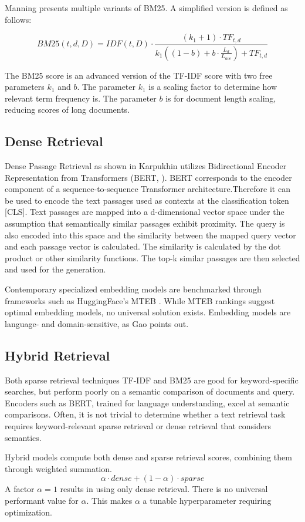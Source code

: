 Manning \cite{Manning.2009} presents multiple variants of BM25. A simplified version is defined as follows:

$$BM25(t, d, D) = IDF(t, D) \cdot \frac{(k_1 + 1) \cdot TF_{t, d}}{k_1((1-b)+b \cdot \frac{L_d}{L_{ave}}) + TF_{t, d}}$$


The BM25 score is an advanced version of the TF-IDF score with two free parameters $k_1$ and $b$. The parameter $k_1$ is a scaling factor to determine how relevant term frequency is. The parameter $b$ is for document length scaling, reducing scores of long documents. 

\subsection{Dense Retrieval}
\label{sec:dense_retrieval}

Dense Passage Retrieval as shown in Karpukhin \cite{karpukhin2020densepassageretrievalopendomain} utilizes Bidirectional Encoder Representation from Transformers (BERT, \cite{devlin2019bertpretrainingdeepbidirectional}). BERT corresponds to the encoder component of a sequence-to-sequence Transformer architecture.Therefore it can be used to encode the text passages used as contexts at the classification token [CLS]. Text passages are mapped into a d-dimensional vector space under the assumption that semantically similar passages exhibit proximity. The query is also encoded into this space and the similarity between the mapped query vector and each passage vector is calculated. The similarity is calculated by the dot product or other similarity functions. The top-k similar passages are then selected and used for the generation.

Contemporary specialized embedding models are benchmarked through frameworks such as HuggingFace's MTEB \cite{muennighoff2022mteb}. While MTEB rankings suggest optimal embedding models, no universal solution exists. Embedding models are language- and domain-sensitive, as Gao \cite{Gao.18.12.2023} points out. 

\subsection{Hybrid Retrieval}
\label{sec:hybrid_retrieval}

Both sparse retrieval techniques TF-IDF and BM25 are good for keyword-specific searches, but perform poorly on a semantic comparison of documents and query. Encoders such as BERT, trained for language understanding, excel at semantic comparisons. Often, it is not trivial to determine whether a text retrieval task requires keyword-relevant sparse retrieval or dense retrieval that considers semantics.

Hybrid models compute both dense and sparse retrieval scores, combining them through weighted summation.
$$\alpha \cdot dense+(1 - \alpha )\cdot sparse$$ A factor $\alpha=1$ results in using only dense retrieval. There is no universal performant value for $\alpha$. This makes $\alpha$ a tunable hyperparameter requiring optimization.
